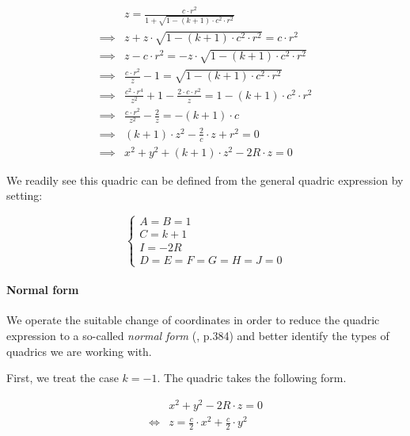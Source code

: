\begin{equation} \begin{split}
&z = \frac{c \cdot r^2}{1 + \sqrt{1 - (k + 1) \cdot c^2 \cdot r^2}} \\
\implies & z + z \cdot \sqrt{1 - (k+1) \cdot c^2 \cdot r^2} = c \cdot r^2 \\
\implies & z - c \cdot r^2 = - z \cdot \sqrt{1 - (k + 1) \cdot c^2 \cdot r^2} \\
\implies & \frac{c \cdot r^2}{z} - 1 = \sqrt{1 - (k + 1) \cdot c^2 \cdot r^2} \\
\implies & \frac{c^2 \cdot r^4}{z^2} + 1 - \frac{2 \cdot c \cdot r^2}{z} =
           1 - (k + 1) \cdot c^2 \cdot r^2 \\
\implies & \frac{c \cdot r^2}{z^2} - \frac{2}{z} = - (k + 1) \cdot c \\
\implies & (k + 1) \cdot z^2 - \frac{2}{c} \cdot z + r^2 = 0 \\
\implies & x^2 + y^2 + (k + 1) \cdot z^2 - 2 R \cdot z = 0
\end{split} \end{equation}

We readily see this quadric can be defined from the general quadric expression
by setting:

\begin{equation} \begin{cases}
A = B = 1 \\
C = k + 1 \\
I = -2 R \\
D = E = F = G = H = J = 0
\end{cases} \end{equation}

\paragraph{Normal form}
We operate the suitable change of coordinates in order to reduce the quadric
expression to a so-called \emph{normal form} (\cite{wiki:quadric},
\cite{Venit:2008} p.384) and better identify the types of quadrics we are
working with.

First, we treat the case $k=-1$.
The quadric takes the following form.

\begin{equation} \begin{split}
&x^2 + y^2 - 2 R \cdot z = 0 \\
\iff &z = \frac{c}{2} \cdot x^2 + \frac{c}{2} \cdot y^2
\end{split} \end{equation}

